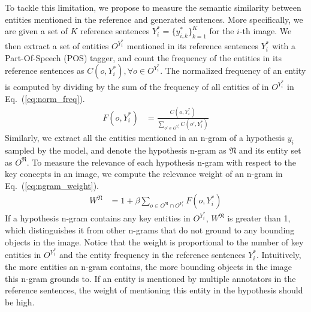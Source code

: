 \documentclass[letterpaper]{article} \usepackage{aaai20}  \usepackage{times}  \usepackage{helvet} \usepackage{courier}  \usepackage[hyphens]{url}  \usepackage{graphicx} \urlstyle{rm} \def\UrlFont{\rm}  \usepackage{graphicx}  \frenchspacing  \setlength{\pdfpagewidth}{8.5in}  \setlength{\pdfpageheight}{11in}  \usepackage{times}
\newcommand{\ngram}{\mathfrak{N}} \newcommand{\relevence}{\mathcal{R}} \newcommand{\coherence}{\mathcal{C}} \newcommand{\expressive}{\mathcal{E}} \newcommand{\model}{ReCo-RL } \newcommand{\mle}{MLE }
\begin{document}
To tackle this limitation, we propose to measure the semantic similarity between entities mentioned in the reference and generated sentences. More specifically, we are given a set of $K$ reference sentences $Y_i^* = \{y_{i,k}^*\}_{k=1}^K$ for the $i$-th image. We then extract a set of entities $O^{Y_i^*}$ mentioned in its reference sentences $Y_i^*$ with a Part-Of-Speech (POS) tagger, and count the frequency of the entities in its reference sentences as $C(o, Y_i^*), \forall o\in O^{Y_i^*}$. The normalized frequency of an entity is computed by dividing by the sum of the frequency of all entities of in $O^{Y_i^*}$ in Eq.~(\ref{eq:norm_freq}). 
\begin{align} \label{eq:norm_freq}
    F(o, Y^*_i) &= \frac{C(o, Y^*_i)}{\sum_{o'\in O^{Y^*_i}} C(o', Y^*_i)} 
\end{align}
Similarly, we extract all the entities mentioned in an n-gram of a hypothesis $y_i$ sampled by the model, and denote the hypothesis n-gram as $\ngram$ and its entity set as $O^\ngram$. To measure the relevance of each hypothesis n-gram with respect to the key concepts in an image, we compute the relevance weight of an n-gram in Eq.~(\ref{eq:ngram_weight}). 
\begin{align}  \label{eq:ngram_weight}
    W^\ngram &= 1 + \beta\sum_{o \in O^\ngram \cap O^{Y^*_i}} F(o, Y^*_i) 
\end{align}
If a hypothesis n-gram contains any key entities in $O^{Y_i^*}$, $W^\ngram$ is greater than 1, which distinguishes it from other n-grams that do not ground to any bounding objects in the image. Notice that the weight is proportional to the number of key entities in $O^{Y_i^*}$ and the entity frequency in the reference sentences $Y_i^*$. Intuitively, the more entities an n-gram contains, the more bounding objects in the image this n-gram grounds to. If an entity is mentioned by multiple annotators in the reference sentences, the weight of mentioning this entity in the hypothesis should be high. 
\end{document}
